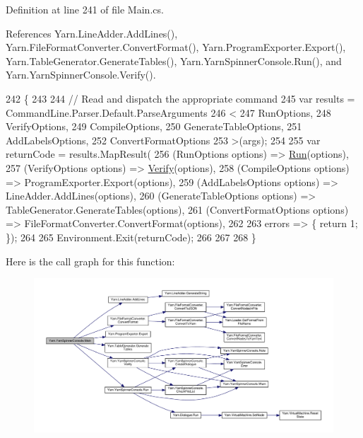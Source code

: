 Definition at line 241 of file Main.\-cs.



References Yarn.\-Line\-Adder.\-Add\-Lines(), Yarn.\-File\-Format\-Converter.\-Convert\-Format(), Yarn.\-Program\-Exporter.\-Export(), Yarn.\-Table\-Generator.\-Generate\-Tables(), Yarn.\-Yarn\-Spinner\-Console.\-Run(), and Yarn.\-Yarn\-Spinner\-Console.\-Verify().


\begin{DoxyCode}
242         \{
243 
244             \textcolor{comment}{// Read and dispatch the appropriate command}
245             var results = CommandLine.Parser.Default.ParseArguments
246             <
247             RunOptions,
248             VerifyOptions,
249             CompileOptions,
250             GenerateTableOptions,
251             AddLabelsOptions,
252             ConvertFormatOptions
253             >(args);
254 
255             var returnCode = results.MapResult(
256                 (RunOptions options) => \hyperlink{a00189_a1b974c55540795a9e643c2ec055fbd51}{Run}(options),
257                 (VerifyOptions options) => \hyperlink{a00189_a029a5624e7cc3a16ae586b64f13049de}{Verify}(options),
258                 (CompileOptions options) => ProgramExporter.Export(options),
259                 (AddLabelsOptions options) => LineAdder.AddLines(options),
260                 (GenerateTableOptions options) => TableGenerator.GenerateTables(options),
261                 (ConvertFormatOptions options) => FileFormatConverter.ConvertFormat(options),
262 
263                 errors => \{ \textcolor{keywordflow}{return} 1; \});
264 
265             Environment.Exit(returnCode);
266 
267 
268         \}
\end{DoxyCode}


Here is the call graph for this function\-:
\nopagebreak
\begin{figure}[H]
\begin{center}
\leavevmode
\includegraphics[width=350pt]{a00189_a1d71ff2eb190449ea1d42ce86f44489f_cgraph}
\end{center}
\end{figure}


